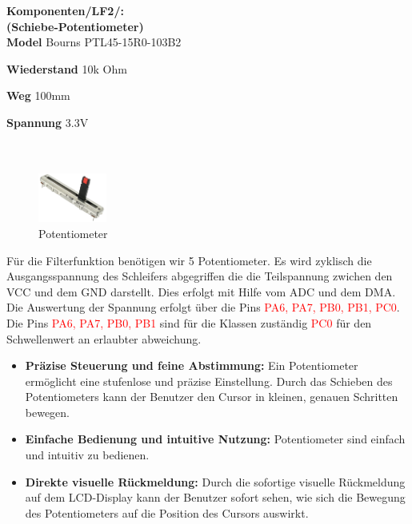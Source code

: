 \newpage
\textbf{Komponenten/LF2/:}\\

\textbf{(Schiebe-Potentiometer)}\\

\textbf{Model} Bourns PTL45-15R0-103B2

\textbf{Wiederstand} 10k Ohm

\textbf{Weg} 100mm

\textbf{Spannung} 3.3V \\ \\ \\

	\begin{figure} %
	\vspace{-155pt + 0.02\textwidth}
	\hspace{0.07\textwidth} %
	\includegraphics[width=0.2\textwidth]{images/05_technische_spezifikation/Interface/Potentiometer.png} %
	\caption{Potentiometer}
	\label{fig:schiebe_potentiometer}
	\vspace{-20pt}
\end{figure}

Für die Filterfunktion benötigen wir 5 Potentiometer. Es wird zyklisch die Ausgangsspannung des Schleifers abgegriffen die die Teilspannung zwichen den VCC und dem GND darstellt. Dies erfolgt mit Hilfe vom ADC und dem DMA. Die Auswertung der Spannung erfolgt über die Pins  \textcolor{red}{PA6, PA7, PB0, PB1, PC0}. Die Pins  \textcolor{red}{PA6, PA7, PB0, PB1} sind für die Klassen zuständig  \textcolor{red}{PC0} für den Schwellenwert an erlaubter abweichung.

\begin{itemize}
	\item \textbf{Präzise Steuerung und feine Abstimmung:} Ein Potentiometer ermöglicht eine stufenlose und präzise Einstellung. Durch das Schieben des Potentiometers kann der Benutzer den Cursor in kleinen, genauen Schritten bewegen.
	\item \textbf{Einfache Bedienung und intuitive Nutzung:} Potentiometer sind einfach und intuitiv zu bedienen.
	\item \textbf{Direkte visuelle Rückmeldung:} Durch die sofortige visuelle Rückmeldung auf dem LCD-Display kann der Benutzer sofort sehen, wie sich die Bewegung des Potentiometers auf die Position des Cursors auswirkt.
\end{itemize}


